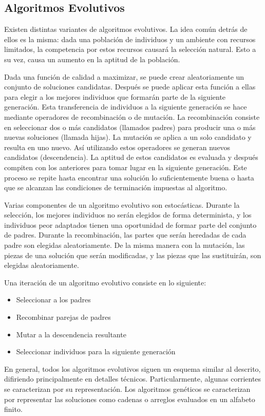 \subsection*{Algoritmos Evolutivos}
Existen distintas variantes de algoritmos evolutivos. La idea común detrás de ellos es la misma: dada una población de individuos y un ambiente con recursos limitados, la competencia por estos recursos causará la selección natural. Esto a su vez, causa un aumento en la aptitud de la población. 
\par Dada una función de calidad a maximizar, se puede crear aleatoriamente un conjunto de soluciones candidatas. Después se puede aplicar esta función a ellas para elegir a los mejores individuos que formarán parte de la siguiente generación. Esta transferencia de individuos a la siguiente generación se hace mediante operadores de recombinación o de mutación. La recombinación consiste en seleccionar dos o más candidatos (llamados padres) para producir una o más nuevas soluciones (llamada hijas). La mutación se aplica a un solo candidato y resulta en uno nuevo. Así utilizando estos operadores se generan nuevos candidatos (descendencia). La aptitud de estos candidatos es evaluada y después compiten con los anteriores para tomar lugar en la siguiente generación. Este proceso se repite hasta encontrar una solución lo suficientemente buena o hasta que se alcanzan las condiciones de terminación impuestas al algoritmo.
\par Varias componentes de un algoritmo evolutivo son estocásticas. Durante la selección, los mejores individuos no serán elegidos de forma determinista, y los individuos peor adaptados tienen una oportunidad de formar parte del conjunto de padres. Durante la recombinación, las partes que serán heredadas de cada padre son elegidas aleatoriamente. De la misma manera con la mutación, las piezas de una solución que serán modificadas, y las piezas que las sustituirán, son elegidas aleatoriamente.
\par Una iteración de un algoritmo evolutivo consiste en lo siguiente:
\begin{itemize}
	\item Seleccionar a los padres
	\item Recombinar parejas de padres
	\item Mutar a la descendencia resultante
	\item Seleccionar individuos para la siguiente generación
\end{itemize}
En general, todos los algoritmos evolutivos siguen un esquema similar al descrito, difiriendo principalmente en detalles técnicos. Particularmente, algunas corrientes se caracterizan por su representación. Los algoritmos genéticos se caracterizan por representar las soluciones como cadenas o arreglos evaluados en un alfabeto finito.
